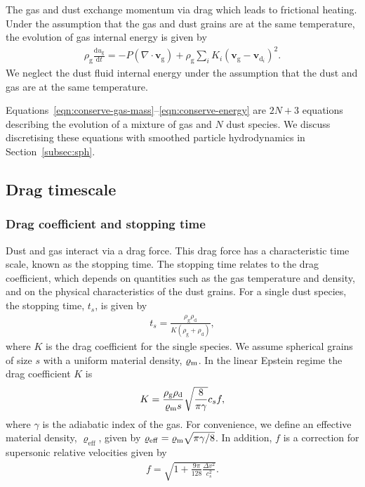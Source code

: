 \documentclass[fleqn,usenatbib]{mnras}
\newcommand{\g}{\mathrm{g}}
\newcommand{\dd}{\mathrm{d}}
\let\vec\bm
\begin{document}
The gas and dust exchange momentum via drag which leads to frictional heating.
Under the assumption that the gas and dust grains are at the same temperature,
the evolution of gas internal energy is given by
%
\begin{align}
   \label{eqn:conserve-energy}
   \rho_{\g} \frac{\dd u_{\g}}{\dd t} =
      - P \left(\nabla \cdot \vec{v}_{\g}\right)
      + \rho_{\g} \sum_i K_i {(\vec{v}_{\g} - \vec{v}_{\dd_i})}^2.
\end{align}
%
We neglect the dust fluid internal energy under the assumption that the dust and
gas are at the same temperature.

Equations~\ref{eqn:conserve-gas-mass}--\ref{eqn:conserve-energy} are \(2N + 3\)
equations describing the evolution of a mixture of gas and \(N\) dust species.
We discuss discretising these equations with smoothed particle hydrodynamics in
Section~\ref{subsec:sph}.

\subsection{Drag timescale}

\subsubsection{Drag coefficient and stopping time}

Dust and gas interact via a drag force. This drag force has a characteristic
time scale, known as the stopping time. The stopping time relates to the drag
coefficient, which depends on quantities such as the gas temperature and
density, and on the physical characteristics of the dust grains. For a single
dust species, the stopping time, \(t_s\), is given by
%
\begin{align}
   \label{eqn:single-stopping-time}
   t_s = \frac{\rho_{\g} \rho_{\dd}}{K (\rho_{\g} + \rho_{\dd})},
\end{align}
%
where \(K\) is the drag coefficient for the single species. We assume spherical
grains of size \(s\) with a uniform material density, \(\varrho_{\rm m}\). In
the linear Epstein regime \citep{Epstein1924PhRv...23..710E} the drag
coefficient \(K\) is
%
\begin{align}
   \label{eqn:single-drag-coefficient}
   K = \frac{\rho_{\g} \rho_{\dd}}{\varrho_{\rm m} s} \sqrt{\frac{8}{\pi\gamma}} c_s f,
\end{align}
%
where \(\gamma\) is the adiabatic index of the gas. For convenience, we define
an effective material density, \(\varrho_{\mathrm{eff}}\), given by
\(\varrho_{\mathrm{eff}} = \varrho_{\rm m} \sqrt{\pi\gamma/8}\). In addition,
\(f\) is a correction for supersonic relative velocities given by
\citep{Kwok1975ApJ...198..583K}
%
\begin{align}
   \label{eqn:supersonic}
   f = \sqrt{1 + \frac{9\pi}{128} \frac{\Delta v^2}{c_s^2}}.
\end{align}
%
\end{document}
